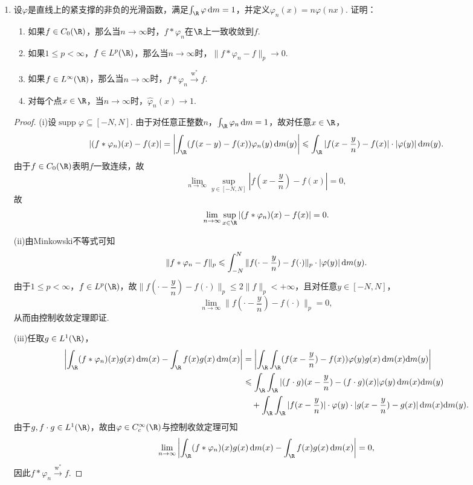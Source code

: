 \begin{enumerate}
\begin{proof}
        如果$\varphi$还可微，则由控制收敛定理易证$\frac{{\rm d}}{{\rm d}x}(\varphi\ast f)(x)=(\varphi'\ast f)(x)$，从而$\varphi\ast f$连续可微。
    \end{proof}
    \item 设$\varphi$是直线上的紧支撑的非负的光滑函数，满足$\int_{\R}\varphi\,\text{d}m=1$，并定义$\varphi_n(x)=n\varphi(nx)$. 证明：
    \begin{enumerate}[label=(\roman*)]
        \item 如果$f\in C_0(\R)$，那么当$n\to\infty$时，$f\ast\varphi_n$在$\R$上一致收敛到$f$.
        \item 如果$1\leqslant p<\infty$，$f\in L^p(\R)$，那么当$n\to\infty$时，$\|f\ast\varphi_n-f\|_p\to0$.
        \item 如果$f\in L^\infty(\R)$，那么当$n\to\infty$时，$f\ast\varphi_n\stackrel{\text{w}^*}{\rightarrow}f$.
        \item 对每个点$x\in\R$，当$n\to\infty$时，$\hat{\varphi}_n(x)\to1$.
    \end{enumerate}
    \begin{proof}
        (i)设$\operatorname{supp}\varphi\subseteq[-N,N]$. 由于对任意正整数$n$，$\int_{\R}\varphi_n\,{\rm d}m=1$，故对任意$x\in\R$，
        \[|(f\ast\varphi_n)(x)-f(x)|=\left|\int_{\R}(f(x-y)-f(x))\varphi_n(y)\,{\rm d}m(y)\right|\leqslant\int_{\R}|f(x-\dfrac{y}{n})-f(x)|\cdot|\varphi(y)|\,{\rm d}m(y).\]
        由于$f\in C_0(\R)$表明$f$一致连续，故\[\lim_{n\to\infty}\sup_{y\in[-N,N]}|f(x-\dfrac{y}{n})-f(x)|=0,\]故\[\lim_{n\to\infty}\sup_{x\in\R}|(f\ast\varphi_n)(x)-f(x)|=0.\]

        (ii)由Minkowski不等式可知\[\|f\ast\varphi_n-f\|_p\leqslant\int_{-N}^N\|f(\cdot-\dfrac{y}{n})-f(\cdot)\|_p\cdot|\varphi(y)|\,{\rm d}m(y).\]
        由于$1\leqslant p<\infty$，$f\in L^p(\R)$，故$\|f(\cdot-\dfrac{y}{n})-f(\cdot)\|_p\leqslant2\|f\|_p<+\infty$，且对任意$y\in[-N,N]$，
        \[\lim_{n\to\infty}\|f(\cdot-\dfrac{y}{n})-f(\cdot)\|_p=0,\]从而由控制收敛定理即证.

        (iii)任取$g\in L^1(\R)$，
        \begin{align*}
            \left|\int_{\R}(f\ast\varphi_n)(x)g(x)\,{\rm d}m(x)-\int_{\R}f(x)g(x)\,{\rm d}m(x)\right|&=\left|\int_{\R}\int_{\R}(f(x-\dfrac{y}{n})-f(x))\varphi(y)g(x)\,{\rm d}m(x){\rm d}m(y)\right|\\
            &\leqslant \int_{\R}\int_{\R}|(f\cdot g)(x-\dfrac{y}{n})-(f\cdot g)(x)|\varphi(y)\,{\rm d}m(x){\rm d}m(y)\\
            &\quad +\int_{\R}\int_{\R}|f(x-\dfrac{y}{n})|\cdot\varphi(y)\cdot|g(x-\dfrac{y}{n})-g(x)|\,{\rm d}m(x){\rm d}m(y).
        \end{align*}
        由于$g,f\cdot g\in L^1(\R)$，故由$\varphi\in C_c^\infty(\R)$与控制收敛定理可知
        \[\lim_{n\to\infty}\left|\int_{\R}(f\ast\varphi_n)(x)g(x)\,{\rm d}m(x)-\int_{\R}f(x)g(x)\,{\rm d}m(x)\right|=0,\]
        因此$f\ast\varphi_n\stackrel{\text{w}^*}{\rightarrow}f$.


\end{proof}
\end{enumerate}
